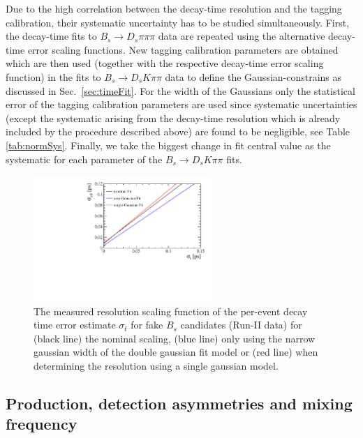 Due to the high correlation between the decay-time resolution and the tagging calibration, their systematic uncertainty has to be studied simultaneously.
First, the decay-time fits to $B_s \to D_s \pi\pi\pi$ data are repeated using the alternative decay-time error scaling functions.
New tagging calibration parameters are obtained which are then used (together with the respective decay-time error scaling function) in the fits to $B_s \to D_s K\pi\pi$ data
to define the Gaussian-constrains as discussed in Sec.~\ref{sec:timeFit}.
For the width of the Gaussians only the statistical error of the tagging calibration parameters are used since systematic uncertainties (except the systematic arising from the decay-time resolution which is already included by the procedure described above) are found to be negligible, see Table \ref{tab:normSys}.
Finally, we take the biggest change in fit central value as the systematic for each parameter of the $B_s \to D_s K\pi\pi$ fits.

\begin{figure}[h]
\centering
\includegraphics[height=!,width=0.6\textwidth]{figs/Resolution/ResoSyst.pdf}
\caption{\small The measured resolution scaling function of the per-event decay time error estimate $\sigma_t$ for fake $B_s$ candidates (Run-II data) 
for (black line) the nominal scaling, (blue line) only using the narrow gaussian width of the double gaussian fit model or (red line) when determining the resolution using a single gaussian model.}
\label{fig:SystscaleFactor}
\end{figure}


\subsection{Production, detection asymmetries and mixing frequency}


